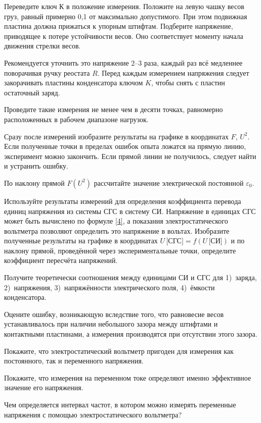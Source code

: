 \begin{lab:task}
		Переведите ключ К в положение измерения. Положите на левую чашку весов
груз, равный примерно 0,1 от максимально
		допустимого. При этом подвижная пластина должна прижаться к упорным
штифтам. Подберите напряжение, приводящее к потере
		устойчивости весов. Оно соответствует моменту начала движения стрелки
весов.

		Рекомендуется уточнить это напряжение 2--3 раза, каждый раз всё
медленнее поворачивая ручку реостата $R$. Перед каждым
		измерением напряжения следует закорачивать пластины конденсатора ключом
$K$, чтобы снять с пластин остаточный заряд.

		Проведите такие измерения не менее чем в десяти точках, равномерно
расположенных в рабочем диапазоне нагрузок.

		\item Сразу после измерений изобразите результаты на графике в
координатах $F$, $U^2$. Если полученные точки в пределах
		ошибок опыта ложатся на прямую линию, эксперимент можно закончить. Если
прямой линии не получилось, следует найти и
		устранить ошибку.

		\item По наклону прямой $F(U^2)$  рассчитайте значение электрической
постоянной $\varepsilon_0$.

		\item Используйте результаты измерений для определения коэффициента
перевода единиц напряжения из системы СГС в систему СИ.
		Напряжение в единицах СГС может быть вычислено по формуле \eqref{4}, а
показания электростатического вольтметра позволяют
		определить это напряжение в вольтах. Изобразите полученные результаты на
графике в координатах $U\,\text{[СГС]}=f(U\,\text{[СИ]})$ и по
		наклону прямой, проведённой через экспериментальные точки, определите
коэффициент пересчёта напряжений.

\end{lab:task}

\begin{lab:questions}
    \item Получите теоретически соотношения между единицами СИ и СГС для
    1)~заряда, 2)~напряжения, 3)~напряжённости электрического поля, 4)~ёмкости
    конденсатора.

	\item Оцените ошибку, возникающую вследствие того, что равновесие весов
устанавливалось при наличии небольшого зазора между
	штифтами и контактными пластинами, а измерения производятся при отсутствии
этого зазора.

	\item Покажите, что электростатический вольтметр пригоден для измерения как
постоянного, так и переменного напряжения.

	\item Покажите, что измерения на переменном токе определяют именно
эффективное значение его напряжения.

	\item Чем определяется интервал частот, в котором можно измерять переменные
напряжения с помощью электростатического
	вольтметра?
\end{lab:questions}

